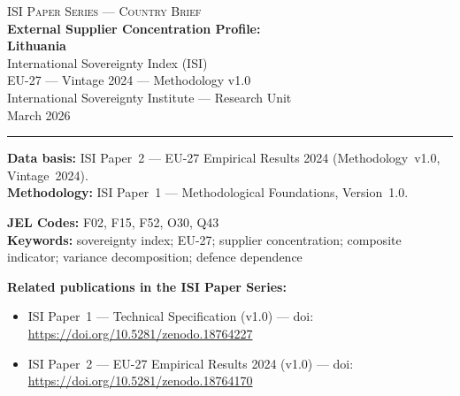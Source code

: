 \documentclass[12pt,a4paper]{article}
\begin{document}
\hypersetup{pageanchor=false}

\begin{titlepage}
\centering
\vspace*{2cm}
{\Large\textsc{ISI Paper Series --- Country Brief}}\\[1.2cm]
{\LARGE\bfseries External Supplier Concentration Profile:\\[0.3em]
Lithuania}\\[1.5cm]
{\large International Sovereignty Index (ISI)\\[0.3em]
EU-27 --- Vintage 2024 --- Methodology v1.0}\\[1.2cm]
{\large International Sovereignty Institute --- Research Unit}\\[0.8cm]
{\large March 2026}

\vspace{0.8cm}
\noindent\rule{\textwidth}{0.4pt}
\vspace{0.4cm}

\begin{flushleft}
\noindent\textbf{Data basis:} ISI Paper~2 --- EU-27 Empirical Results 2024 (Methodology~v1.0, Vintage~2024).\\[4pt]
\noindent\textbf{Methodology:} ISI Paper~1 --- Methodological Foundations, Version~1.0.

\medskip

\noindent\textbf{JEL Codes:} F02, F15, F52, O30, Q43\\[4pt]
\noindent\textbf{Keywords:} sovereignty index; EU-27; supplier concentration; composite indicator; variance decomposition; defence dependence

\medskip

\noindent\textbf{Related publications in the ISI Paper Series:}
\begin{itemize}[nosep,leftmargin=1.5em]
\item ISI Paper~1 --- Technical Specification (v1.0) --- doi:\\
  \url{https://doi.org/10.5281/zenodo.18764227}
\item ISI Paper~2 --- EU-27 Empirical Results 2024 (v1.0) --- doi:\\
  \url{https://doi.org/10.5281/zenodo.18764170}
\end{itemize}
\end{flushleft}
\vfill
\end{titlepage}
\end{document}
